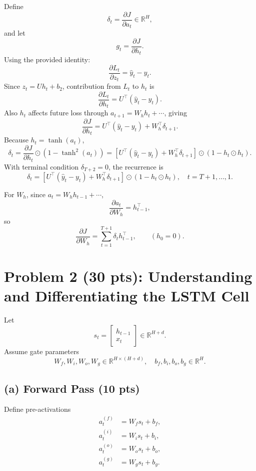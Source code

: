 \documentclass[11pt]{article}
\begin{document}
Define
\[
\delta_t = \frac{\partial J}{\partial a_t} \in \mathbb{R}^H,
\]
and let
\[
g_t = \frac{\partial J}{\partial h_t}.
\]
Using the provided identity:
\[
\frac{\partial L_t}{\partial z_t} = \hat y_t - y_t.
\]
Since $z_t = U h_t + b_2$, contribution from $L_t$ to $h_t$ is
\[
\frac{\partial L_t}{\partial h_t} = U^\top(\hat y_t - y_t).
\]
Also $h_t$ affects future loss through $a_{t+1}=W_h h_t + \cdots$, giving
\[
\frac{\partial J}{\partial h_t} = U^\top(\hat y_t - y_t) + W_h^\top \delta_{t+1}.
\]
Because $h_t = \tanh(a_t)$,
\[
\delta_t
= \frac{\partial J}{\partial h_t} \odot \left(1-\tanh^2(a_t)\right)
= \left[U^\top(\hat y_t-y_t) + W_h^\top\delta_{t+1}\right] \odot (1-h_t\odot h_t).
\]
With terminal condition $\delta_{T+2}=0$, the recurrence is
\[
\boxed{
\delta_t = \left[U^\top(\hat y_t-y_t) + W_h^\top\delta_{t+1}\right] \odot (1-h_t\odot h_t),
\quad t=T+1,\dots,1.
}
\]

For $W_h$, since $a_t = W_h h_{t-1}+\cdots$,
\[
\frac{\partial a_t}{\partial W_h} = h_{t-1}^\top,
\]
so
\[
\boxed{
\frac{\partial J}{\partial W_h} = \sum_{t=1}^{T+1} \delta_t h_{t-1}^\top,
\qquad (h_0=0).
}
\]

\newpage
\section*{Problem 2 (30 pts): Understanding and Differentiating the LSTM Cell}

Let
\[
s_t = \begin{bmatrix} h_{t-1} \\ x_t \end{bmatrix} \in \mathbb{R}^{H+d}.
\]
Assume gate parameters
\[
W_f,W_i,W_o,W_g \in \mathbb{R}^{H\times(H+d)},
\quad
b_f,b_i,b_o,b_g \in \mathbb{R}^{H}.
\]

\subsection*{(a) Forward Pass (10 pts)}

Define pre-activations
\[
\begin{aligned}
a_t^{(f)} &= W_f s_t + b_f, \\
a_t^{(i)} &= W_i s_t + b_i, \\
a_t^{(o)} &= W_o s_t + b_o, \\
a_t^{(g)} &= W_g s_t + b_g.
\end{aligned}
\]
\end{document}
